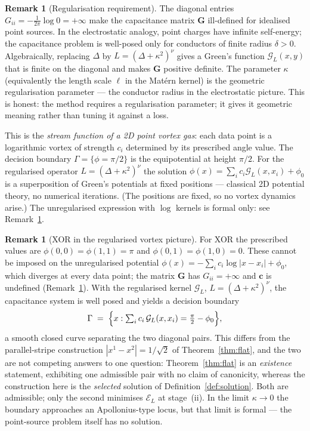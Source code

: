 \documentclass[11pt, a4paper]{article}
\theoremstyle{plain}
\theoremstyle{definition}
\newtheorem{remark}[theorem]{Remark}
\newcommand{\Gam}{\Gamma}
\newcommand{\Gr}{\mathcal{G}}   %
\begin{document}
\begin{remark}[Regularisation requirement]\label{rem:regularisation}
The diagonal entries $G_{ii} = -\frac{1}{2\pi}\log 0 = +\infty$ make the
capacitance matrix $\mathbf{G}$ ill-defined for idealised point sources. In the
electrostatic analogy, point charges have infinite self-energy; the capacitance
problem is well-posed only for conductors of finite radius $\delta > 0$.
Algebraically, replacing $\Delta$ by $L = (\Delta + \kappa^2)^\nu$ gives a
Green's function $\Gr_L(x,y)$ that is finite on the diagonal and makes
$\mathbf{G}$ positive definite. The parameter $\kappa$ (equivalently the length
scale $\ell$ in the Matérn kernel) is the geometric regularisation parameter ---
the conductor radius in the electrostatic picture. This is honest: the method
requires a regularisation parameter; it gives it geometric meaning rather than
tuning it against a loss.
\end{remark}

This is the \emph{stream function of a 2D point vortex gas}: each data point is
a logarithmic vortex of strength $c_i$ determined by its prescribed angle value.
The decision boundary $\Gam = \{\phi = \pi/2\}$ is the equipotential at height
$\pi/2$. For the regularised operator $L = (\Delta+\kappa^2)^\nu$ the solution
$\phi(x) = \sum_i c_i \Gr_L(x,x_i) + \phi_0$ is a superposition of Green's
potentials at fixed positions --- classical 2D potential theory, no numerical
iterations. (The positions are fixed, so no vortex dynamics arise.) The
unregularised expression with $\log$ kernels is formal only: see
Remark~\ref{rem:regularisation}.

\begin{remark}[XOR in the regularised vortex picture]\label{rem:xor-vortex}
For XOR the prescribed values are $\phi(0,0) = \phi(1,1) = \pi$ and
$\phi(0,1) = \phi(1,0) = 0$. These cannot be imposed on the unregularised
potential $\phi(x) = -\sum_i c_i\log|x-x_i| + \phi_0$, which diverges at every
data point; the matrix $\mathbf{G}$ has $G_{ii} = +\infty$ and $\mathbf{c}$ is
undefined (Remark~\ref{rem:regularisation}). With the regularised kernel
$\Gr_L$, $L = (\Delta+\kappa^2)^\nu$, the capacitance system is well posed and
yields a decision boundary
\[
  \Gam \;=\; \Bigl\{x : \textstyle\sum_i c_i\,\Gr_L(x,x_i) = \tfrac{\pi}{2} - \phi_0\Bigr\},
\]
a smooth closed curve separating the two diagonal pairs. This differs from the
parallel-stripe construction $|x^1-x^2| = 1/\sqrt{2}$ of
Theorem~\ref{thm:flat}, and the two are not competing answers to one question:
Theorem~\ref{thm:flat} is an \emph{existence} statement, exhibiting one
admissible pair with no claim of canonicity, whereas the construction here is
the \emph{selected} solution of Definition~\ref{def:solution}. Both are
admissible; only the second minimises $\mathcal{E}_L$ at stage~(ii). In the
limit $\kappa \to 0$ the boundary approaches an Apollonius-type locus,
but that limit is formal --- the point-source problem itself has no solution.
\end{remark}
\end{document}
